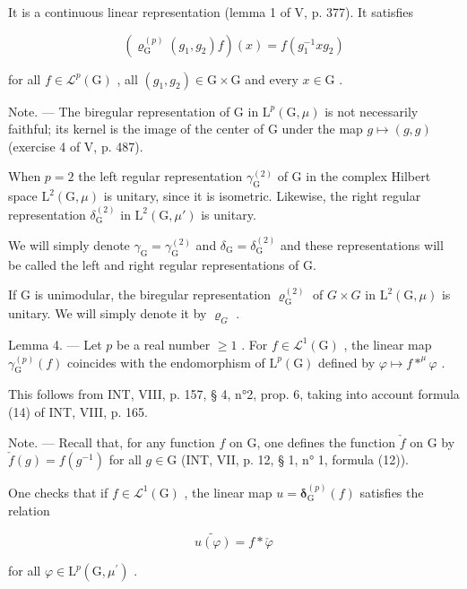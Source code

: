 It is a continuous linear representation (lemma 1 of V, p. 377). It satisfies

\[
(\boldsymbol {\varrho} _ {\mathrm{G}} ^ {(p)} (g _ {1}, g _ {2}) f) (x) = f (g _ {1} ^ {- 1} x g _ {2})
\]

for all \(f \in \mathcal{L}^p(\mathrm{G})\) , all \((g_1, g_2) \in \mathrm{G} \times \mathrm{G}\) and every \(x \in \mathrm{G}\) .

Note. --- The biregular representation of G in \(\mathrm{L}^{p}(\mathrm{G},\mu)\) is not necessarily faithful; its kernel is the image of the center of G under the map \(g\mapsto(g,g)\) (exercise 4 of V, p. 487).

When \(p = 2\) the left regular representation \(\gamma_{\mathrm{G}}^{(2)}\) of G in the complex Hilbert space \(\mathrm{L}^2 (\mathrm{G},\mu)\) is unitary, since it is isometric. Likewise, the right regular representation \(\delta_{\mathrm{G}}^{(2)}\) in \(\mathrm{L}^2 (\mathrm{G},\mu')\) is unitary.

We will simply denote \(\gamma_{\mathrm{G}} = \gamma_{\mathrm{G}}^{(2)}\) and \(\delta_{\mathrm{G}} = \delta_{\mathrm{G}}^{(2)}\) and these representations will be called the left and right regular representations of G.

If G is unimodular, the biregular representation \(\varrho_{\mathrm{G}}^{(2)}\) of \(G \times G\) in \(\mathrm{L}^{2}(\mathrm{G}, \mu)\) is unitary. We will simply denote it by \(\varrho_{G}\) .

Lemma 4. --- Let \(p\) be a real number \(\geqslant 1\) . For \(f \in \mathcal{L}^1(\mathrm{G})\) , the linear map \(\gamma_{\mathrm{G}}^{(p)}(f)\) coincides with the endomorphism of \(\mathrm{L}^p(\mathrm{G})\) defined by \(\varphi \mapsto f *^\mu \varphi\) .

This follows from INT, VIII, p. 157, § 4, n°2, prop. 6, taking into account formula (14) of INT, VIII, p. 165.

Note. --- Recall that, for any function \(f\) on G, one defines the function \(\check{f}\) on G by \(\check{f}(g) = f(g^{-1})\) for all \(g \in \mathrm{G}\) (INT, VII, p. 12, § 1, n° 1, formula (12)).

One checks that if \(f \in \mathcal{L}^{1}(\mathrm{G})\) , the linear map \(u = \boldsymbol{\delta}_{\mathrm{G}}^{(p)}(f)\) satisfies the relation

\[
\widetilde {u (\varphi)} = f * \check {\varphi}
\]

for all \(\varphi\in\mathrm{L}^{p}(\mathrm{G},\mu^{\prime})\) .
\relax{}

